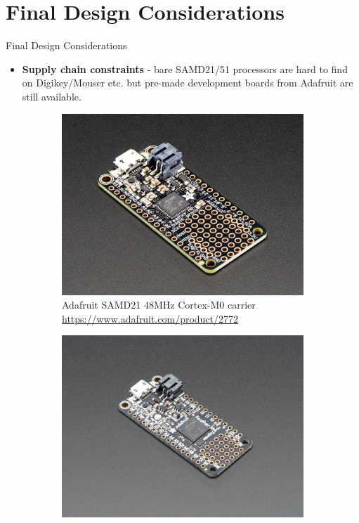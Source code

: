 \documentclass[UKenglish]{beamer}
\begin{document}
\section{Final Design Considerations}
\begin{frame}[allowframebreaks]{Final Design Considerations}
	
	\begin{itemize}
		\item \textbf{Supply chain constraints} - bare SAMD21/51 processors are hard to find on Digikey/Mouser etc. but pre-made development boards from Adafruit are still available.
	\end{itemize}	

	\begin{figure}[h!]
		\begin{subfigure}{0.4\textwidth}
			\centering
			\includegraphics[width=\textwidth]{images/featherm0.jpg}
			\caption{Adafruit SAMD21 48MHz Cortex-M0 carrier \tiny{\url{https://www.adafruit.com/product/2772}}}
		\end{subfigure}
		\qquad
		\begin{subfigure}{0.4\textwidth}
			\centering
			\includegraphics[width=\textwidth]{images/featherm4.jpg}

\end{subfigure}
\end{figure}
\end{frame}
\end{document}
